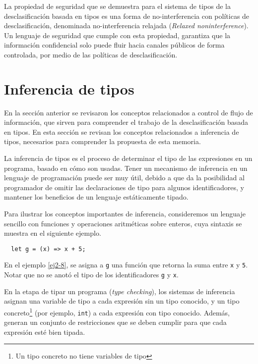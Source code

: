La propiedad de seguridad que se demuestra para el sistema de tipos de la desclasificación basada en tipos es una forma de no-interferencia con políticas de desclasificación, denominada no-interferencia relajada (\emph{Relaxed noninterference}). Un lenguaje de seguridad que cumple con esta propiedad, garantiza que la información confidencial solo puede fluir hacia canales públicos de forma controlada, por medio de las políticas de desclasificación.

\section{Inferencia de tipos} \label{inference}
En la sección anterior se revisaron los conceptos relacionados a control de flujo de información, que sirven para comprender el trabajo de la desclasificación basada en tipos. En esta sección se revisan los conceptos relacionados a inferencia de tipos, necesarios para comprender la propuesta de esta memoria.

La inferencia de tipos es el proceso de determinar el tipo de las expresiones en un programa, basado en cómo son usadas. Tener un mecanismo de inferencia en un lenguaje de programación puede ser muy útil, debido a que da la posibilidad al programador de omitir las declaraciones de tipo para algunos identificadores, y mantener los beneficios de un lenguaje estáticamente tipado.

Para ilustrar los conceptos importantes de inferencia, consideremos un lenguaje sencillo con funciones y operaciones aritméticas sobre enteros, cuya sintaxis se muestra en el siguiente ejemplo.
\vspace{0.8em}
\begin{ej}
  \normalfont
  \label{ej2-8}
\begin{lstlisting}
  let g = (x) => x + 5;
\end{lstlisting}
\end{ej}

En el ejemplo \ref{ej2-8}, se asigna a \texttt{g} una función que retorna la suma entre \texttt{x} y \texttt{5}. Notar que no se anotó el tipo de los identificadores \texttt{g} y \texttt{x}.

En la etapa de tipar un programa (\emph{type checking}), los sistemas de inferencia asignan una variable de tipo a cada expresión sin un tipo conocido, y un tipo concreto\footnote{Un tipo concreto no tiene variables de tipo} (por ejemplo, \texttt{int}) a cada expresión con tipo conocido. Además, generan un conjunto de restricciones que se deben cumplir para que cada expresión esté bien tipada.
\clearpage

